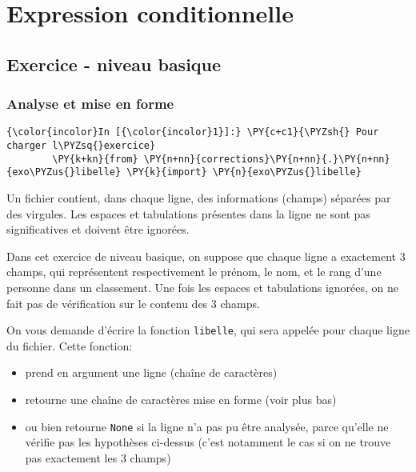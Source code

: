     
    
    
    

    

    \hypertarget{expression-conditionnelle}{%
\section{Expression conditionnelle}\label{expression-conditionnelle}}

    \hypertarget{exercice---niveau-basique}{%
\subsection{Exercice - niveau basique}\label{exercice---niveau-basique}}

    \hypertarget{analyse-et-mise-en-forme}{%
\subsubsection{Analyse et mise en
forme}\label{analyse-et-mise-en-forme}}

    \begin{Verbatim}[commandchars=\\\{\},frame=single,framerule=0.3mm,rulecolor=\color{cellframecolor}]
{\color{incolor}In [{\color{incolor}1}]:} \PY{c+c1}{\PYZsh{} Pour charger l\PYZsq{}exercice}
        \PY{k+kn}{from} \PY{n+nn}{corrections}\PY{n+nn}{.}\PY{n+nn}{exo\PYZus{}libelle} \PY{k}{import} \PY{n}{exo\PYZus{}libelle}
\end{Verbatim}


    Un fichier contient, dans chaque ligne, des informations (champs)
séparées par des virgules. Les espaces et tabulations présentes dans la
ligne ne sont pas significatives et doivent être ignorées.

Dans cet exercice de niveau basique, on suppose que chaque ligne a
exactement 3 champs, qui représentent respectivement le prénom, le nom,
et le rang d'une personne dans un classement. Une fois les espaces et
tabulations ignorées, on ne fait pas de vérification sur le contenu des
3 champs.

On vous demande d'écrire la fonction \texttt{libelle}, qui sera appelée
pour chaque ligne du fichier. Cette fonction:

\begin{itemize}
\tightlist
\item
  prend en argument une ligne (chaîne de caractères)
\item
  retourne une chaîne de caractères mise en forme (voir plus bas)
\item
  ou bien retourne \texttt{None} si la ligne n'a pas pu être analysée,
  parce qu'elle ne vérifie pas les hypothèses ci-dessus (c'est notamment
  le cas si on ne trouve pas exactement les 3 champs)
\end{itemize}

